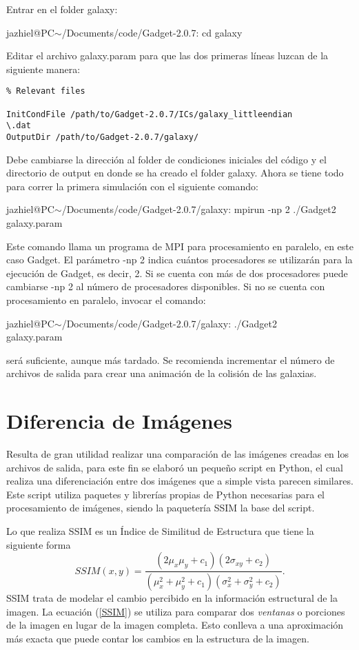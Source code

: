 \documentclass[a4paper,openright,10pt, oneside, final]{book}
\begin{document}
\begin{enumerate}
Entrar en el folder \textsf{galaxy}:

\textsf{jazhiel@PC$\sim$/Documents/code/Gadget-2.0.7: cd galaxy}

Editar el archivo \textsf{galaxy.param} para que las dos primeras líneas luzcan de la siguiente manera:

\begin{verbatim}
% Relevant files

InitCondFile /path/to/Gadget-2.0.7/ICs/galaxy_littleendian
\.dat
OutputDir /path/to/Gadget-2.0.7/galaxy/
\end{verbatim}

Debe cambiarse la dirección al folder de condiciones iniciales del código y el directorio de \textsf{output} en donde se ha creado el folder \textsf{galaxy}. Ahora se tiene todo para correr la primera simulación con el siguiente comando:

\textsf{jazhiel@PC$\sim$/Documents/code/Gadget-2.0.7/galaxy: mpirun -np 2 ./Gadget2 galaxy.param}

Este comando llama un programa de MPI para procesamiento en paralelo, en este caso Gadget. El parámetro \textsf{-np 2} indica cuántos procesadores se utilizarán para la ejecución de Gadget, es decir, 2. Si se cuenta con más de dos procesadores puede cambiarse \textsf{-np 2} al número de procesadores disponibles. Si no se cuenta con procesamiento en paralelo, invocar el comando:

\textsf{jazhiel@PC$\sim$/Documents/code/Gadget-2.0.7/galaxy: ./Gadget2\\ galaxy.param}

será suficiente, aunque más tardado. Se recomienda incrementar el número de archivos de salida para crear una animación de la colisión de las galaxias.
\end{enumerate}

\chapter{Diferencia de Imágenes}
Resulta de gran utilidad realizar una comparación de las imágenes creadas en los archivos de salida, para este fin se elaboró un pequeño script en Python, el cual realiza una diferenciación entre dos imágenes que a simple vista parecen similares. Este script utiliza paquetes y librerías propias de Python necesarias para el procesamiento de imágenes, siendo la paquetería \textsf{SSIM} la base del script.

Lo que realiza \textsf{SSIM} es un Índice de Similitud de Estructura \cite{4.6} que tiene la siguiente forma
\begin{equation}
SSIM(x,y) = \frac{(2\mu_{x}\mu_{y}+c_{1})(2\sigma_{xy}+c_{2})}{(\mu_{x}^{2}+\mu_{y}^{2}+c_{1})(\sigma_{x}^{2}+\sigma_{y}^{2}+c_{2})}.\label{SSIM}
\end{equation}
\textsf{SSIM} trata de modelar el cambio percibido en la informaci\'on estructural de la imagen. La ecuación (\ref{SSIM}) se utiliza para comparar dos \textit{ventanas} o porciones de la imagen en lugar de la imagen completa. Esto conlleva a una aproximaci\'on más exacta que puede contar los cambios en la estructura de la imagen.
\end{document}
